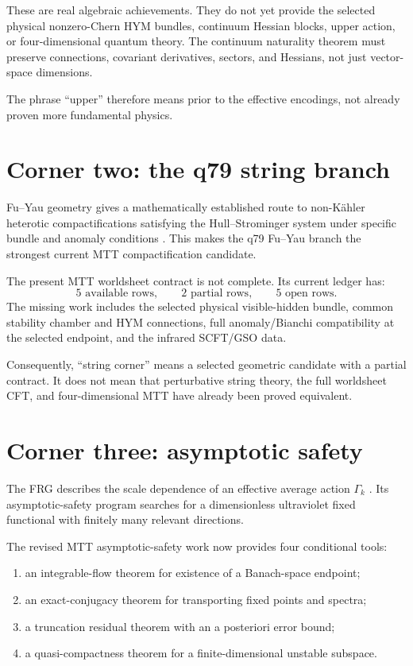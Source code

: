 \documentclass[11pt]{article}
\begin{document}
These are real algebraic achievements. They do not yet provide the selected
physical nonzero-Chern HYM bundles, continuum Hessian blocks, upper action,
or four-dimensional quantum theory. The continuum naturality theorem must
preserve connections, covariant derivatives, sectors, and Hessians, not just
vector-space dimensions.

The phrase ``upper'' therefore means prior to the effective encodings, not
already proven more fundamental physics.

\section{Corner two: the q79 string branch}

Fu--Yau geometry gives a mathematically established route to non-K\"ahler
heterotic compactifications satisfying the Hull--Strominger system under
specific bundle and anomaly conditions \cite{Strominger,FuYau}. This makes
the q79 Fu--Yau branch the strongest current MTT compactification candidate.

The present MTT worldsheet contract is not complete. Its current ledger has:
\[
5\text{ available rows},\qquad
2\text{ partial rows},\qquad
5\text{ open rows}.
\]
The missing work includes the selected physical visible-hidden bundle,
common stability chamber and HYM connections, full anomaly/Bianchi
compatibility at the selected endpoint, and the infrared SCFT/GSO data.

Consequently, ``string corner'' means a selected geometric candidate with a
partial contract. It does not mean that perturbative string theory, the full
worldsheet CFT, and four-dimensional MTT have already been proved
equivalent.

\section{Corner three: asymptotic safety}

The FRG describes the scale dependence of an effective average action
\(\Gamma_k\) \cite{Wetterich,Reuter}. Its asymptotic-safety program searches
for a dimensionless ultraviolet fixed functional with finitely many
relevant directions.

The revised MTT asymptotic-safety work now provides four conditional tools:
\begin{enumerate}
\item an integrable-flow theorem for existence of a Banach-space endpoint;
\item an exact-conjugacy theorem for transporting fixed points and spectra;
\item a truncation residual theorem with an a posteriori error bound;
\item a quasi-compactness theorem for a finite-dimensional unstable
subspace.
\end{enumerate}
\end{document}
